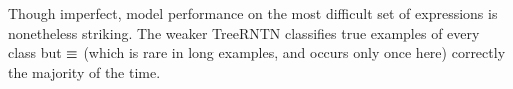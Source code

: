 Though imperfect, model performance on the most difficult set of expressions is nonetheless striking. 
The weaker TreeRNTN classifies true examples of every class but $\equiv$ 
(which is rare in long examples, and occurs only once here) correctly the majority of the time.





